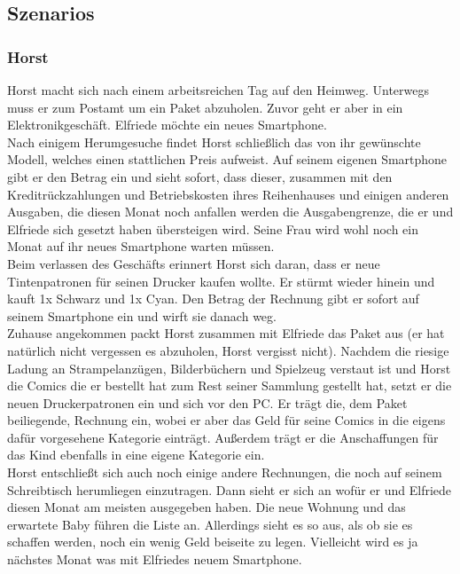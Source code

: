 \subsection{Szenarios}

\subsubsection{Horst}

Horst macht sich nach einem arbeitsreichen Tag auf den Heimweg. Unterwegs muss er zum
Postamt um ein Paket abzuholen. Zuvor geht er aber in ein Elektronikgesch\"aft.
Elfriede m\"ochte ein neues Smartphone.\\

Nach einigem Herumgesuche findet Horst schlie\ss lich das von ihr gew\"unschte
Modell, welches einen stattlichen Preis aufweist. Auf seinem eigenen
Smartphone gibt er den Betrag ein und sieht sofort, dass dieser, zusammen
mit den Kreditr\"uckzahlungen und Betriebskosten ihres Reihenhauses und
einigen anderen Ausgaben, die diesen Monat noch anfallen werden die
Ausgabengrenze, die er und Elfriede sich gesetzt haben \"ubersteigen wird.
Seine Frau wird wohl noch ein Monat auf ihr neues Smartphone warten
m\"ussen.\\

Beim verlassen des Gesch\"afts erinnert Horst sich daran, dass er neue
Tintenpatronen für seinen Drucker kaufen wollte. Er st\"urmt wieder hinein
und kauft 1x Schwarz und 1x Cyan. Den Betrag der Rechnung gibt er sofort
auf seinem Smartphone ein und wirft sie danach weg.\\

Zuhause angekommen packt Horst zusammen mit Elfriede das Paket aus (er hat
nat\"urlich nicht vergessen es abzuholen, Horst vergisst nicht). Nachdem die
riesige Ladung an Strampelanz\"ugen, Bilderb\"uchern und Spielzeug verstaut
ist und Horst die Comics die er bestellt hat zum Rest seiner Sammlung
gestellt hat, setzt er die neuen Druckerpatronen ein und sich vor den PC.
Er tr\"agt die, dem Paket beiliegende, Rechnung ein, wobei er aber das Geld
für seine Comics in die eigens daf\"ur vorgesehene Kategorie eintr\"agt.
Au\ss erdem tr\"agt er die Anschaffungen für das Kind ebenfalls in eine eigene
Kategorie ein.\\

Horst entschlie\ss t sich auch noch einige andere Rechnungen, die noch auf
seinem Schreibtisch herumliegen einzutragen. Dann sieht er sich an wof\"ur er
und Elfriede diesen Monat am meisten ausgegeben haben. Die neue Wohnung und
das erwartete Baby f\"uhren die Liste an. Allerdings sieht es so aus, als ob
sie es schaffen werden, noch ein wenig Geld beiseite zu legen. Vielleicht
wird es ja n\"achstes Monat was mit Elfriedes neuem Smartphone.\\

